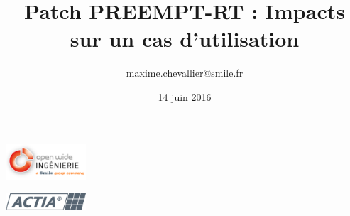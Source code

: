 \documentclass{beamer}
\title[PREEMPT-RT]{Patch PREEMPT-RT : Impacts sur un cas d'utilisation}
\author{maxime.chevallier@smile.fr}
\date{14 juin 2016}
\institute{ Open Wide Ingénierie / Smile \\ Actia}
\begin{document}
\beamertemplatenavigationsymbolsempty{} %

    \begin{frame}

	\titlepage
\begin{minipage}[t]{0.47\linewidth}
\begin{center}
\includegraphics[width=3cm]{img/owi-smile.png} 
\end{center}
\end{minipage}
\begin{minipage}[t]{0.47\linewidth}
\begin{center}
 \includegraphics[width=3cm]{img/logo-actia.png}
\end{center}
\end{minipage}
    \end{frame}





\end{document}
